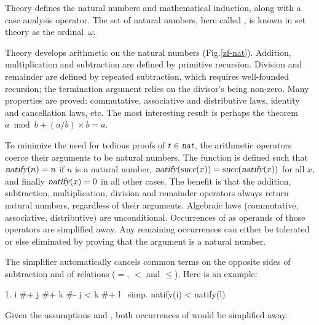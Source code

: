 
Theory  defines the natural numbers and mathematical
induction, along with a case analysis operator.  The set of natural
numbers, here called , is known in set theory as the ordinal~$\omega$.

Theory  develops arithmetic on the natural numbers
(Fig.\ts\ref{zf-nat}).  Addition, multiplication and subtraction are defined
by primitive recursion.  Division and remainder are defined by repeated
subtraction, which requires well-founded recursion; the termination argument
relies on the divisor's being non-zero.  Many properties are proved:
commutative, associative and distributive laws, identity and cancellation
laws, etc.  The most interesting result is perhaps the theorem $a \bmod b +
(a/b)\times b = a$.

To minimize the need for tedious proofs of $t\in\emph{\sl nat}$, the arithmetic
operators coerce their arguments to be natural numbers.  The function
 is defined such that $\emph{\sl natify}(n) = n$ if $n$ is a natural
number, $\emph{\sl natify}(\emph{\sl succ}(x)) =
\emph{\sl succ}(\emph{\sl natify}(x))$ for all $x$, and finally
$\emph{\sl natify}(x)=0$ in all other cases.  The benefit is that the addition,
subtraction, multiplication, division and remainder operators always return
natural numbers, regardless of their arguments.  Algebraic laws (commutative,
associative, distributive) are unconditional.  Occurrences of 
as operands of those operators are simplified away.  Any remaining occurrences
can either be tolerated or else eliminated by proving that the argument is a
natural number.

The simplifier automatically cancels common terms on the opposite sides of
subtraction and of relations ($=$, $<$ and $\le$).  Here is an example:
\begin{isabelle}
 1. i \#+ j \#+ k \#- j < k \#+ l\isanewline
{}\ simp. natify(i) < natify(l)
\end{isabelle}
Given the assumptions  and , both occurrences of
 would be simplified away.


